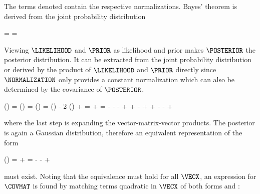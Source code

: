     The terms denoted  contain the respective normalizations.
    Bayes' theorem is derived from the joint probability distribution

    \startformula
        \JOINT = \LIKELIHOOD \PRIOR = \POSTERIOR \NORMALIZATION \EQSTOP
    \stopformula

    Viewing $\LIKELIHOOD$ and $\PRIOR$ as likelihood and prior makes
    $\POSTERIOR$ the posterior distribution. It can be extracted from the joint
    probability distribution or derived by the product of $\LIKELIHOOD$ and
    $\PRIOR$ directly since $\NORMALIZATION$ only provides a constant
    normalization which can also be determined by the covariance of
    $\POSTERIOR$.

    \placesubformula
    \startformula
    \startalign[n=2,align={right,left}]
         \ln(\POSTERIOR) =  \ln\left(\frac{\JOINT}{\NORMALIZATION}\right) \NR
        \NC =  \ln\left(\frac{\LIKELIHOOD \PRIOR}{\NORMALIZATION}\right) \NR
        \NC =  \ln(\LIKELIHOOD) - 2 \ln(\PRIOR) + \CONST \NR
        \NC = \NC \GAUSSEXP{\VECY}{\MATB \VECX - \VECB}{\MATQ}
            + \GAUSSEXP{\VECX}{\VECA}{\MATP} \NR
        \NC = \NC
            \VECYT \MATQ \VECY
            - \VECYT \MATQ \MATB \VECX
            - \VECYT \MATQ \VECB
            - \VECXT \MATBT \MATQ \VECY
            \NR
        \NC \NC
            + \VECXT \MATBT \MATQ \MATB \VECX
            + \VECXT \MATBT \MATQ \VECB
            - \VECBT \MATQ \VECY
            + \VECBT \MATQ \MATB \VECX
            \NR[eq:gaussprodexpand]
        \NC \NC
            + \VECXT \MATP \VECX
            - \VECXT \MATP \VECA
            - \VECAT \MATP \VECX
            + \CONST \EQCOMMA
            \NR
    \stopalign
    \stopformula

    where the last step is expanding the vector-matrix-vector products. The
    posterior is again a Gaussian distribution, therefore an equivalent
    representation of the form

    \placesubformula
    \startformula
    \startalign[n=2,align={right,left}]
         \ln(\POSTERIOR) = \NC
            \GAUSSEXP{\VECX}{\VECC}{\MATS} + \CONST \NR
        \NC = \NC
             \VECXT \MATS \VECX
             - \VECXT \MATS \VECC
             - \VECCT \MATS \VECX
             + \CONST \NR[eq:gausspostexpand]
    \stopalign
    \stopformula

    must exist. Noting that the equivalence must hold for all $\VECX$, an
    expression for $\COVMAT$ is found by matching terms quadratic in $\VECX$ of
    both forms  and :


